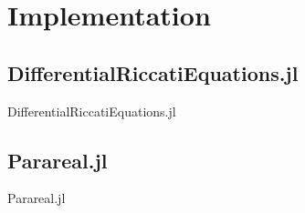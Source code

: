 \section{Implementation}

\lstset{
  columns=fixed,
  style=julia,
  escapechar=\%,
}

\subsection{DifferentialRiccatiEquations.jl}
\begin{frame}[label=code_dre]{DifferentialRiccatiEquations.jl}
\only<+>{}
\end{frame}

\subsection{Parareal.jl}
\begin{frame}[label=code_parareal]{Parareal.jl}
\only<+>{}
\only<+>{}
\only<+>{}
\end{frame}

\lstset{
  columns=flexible,
  style=remark
}

